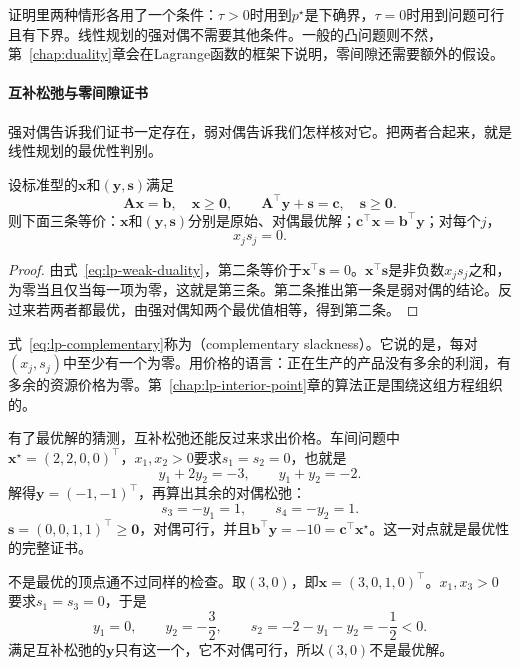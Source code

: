 证明里两种情形各用了一个条件：$\tau>0$时用到$p^\star$是下确界，$\tau=0$时用到问题可行且有下界。线性规划的强对偶不需要其他条件。一般的凸问题则不然，第~\ref{chap:duality}章会在Lagrange函数的框架下说明，零间隙还需要额外的假设。

\paragraph{互补松弛与零间隙证书}
强对偶告诉我们证书一定存在，弱对偶告诉我们怎样核对它。把两者合起来，就是线性规划的最优性判别。

\begin{theorem}[零间隙证书与互补松弛]
 \label{thm:lp-optimality-certificate}
 设标准型的$\bm{x}$和$(\bm{y},\bm{s})$满足
 \begin{equation}
  \bm{A}\bm{x}=\bm{b},\quad\bm{x}\geq\bm{0},\qquad
  \bm{A}^\top\bm{y}+\bm{s}=\bm{c},\quad\bm{s}\geq\bm{0}.
  \label{eq:lp-pd-feasible}
 \end{equation}
 则下面三条等价：$\bm{x}$和$(\bm{y},\bm{s})$分别是原始、对偶最优解；$\bm{c}^\top\bm{x}=\bm{b}^\top\bm{y}$；对每个$j$，
 \begin{equation}
  x_js_j=0.
  \label{eq:lp-complementary}
 \end{equation}
\end{theorem}

\begin{proof}
 由式~\eqref{eq:lp-weak-duality}，第二条等价于$\bm{x}^\top\bm{s}=0$。$\bm{x}^\top\bm{s}$是非负数$x_js_j$之和，为零当且仅当每一项为零，这就是第三条。第二条推出第一条是弱对偶的结论。反过来若两者都最优，由强对偶知两个最优值相等，得到第二条。
\end{proof}

式~\eqref{eq:lp-complementary}称为（complementary slackness）。它说的是，每对$(x_j,s_j)$中至少有一个为零。用价格的语言：正在生产的产品没有多余的利润，有多余的资源价格为零。第~\ref{chap:lp-interior-point}章的算法正是围绕这组方程组织的。

有了最优解的猜测，互补松弛还能反过来求出价格。车间问题中$\bm{x}^\star=(2,2,0,0)^\top$，$x_1,x_2>0$要求$s_1=s_2=0$，也就是
\[
 y_1+2y_2=-3,\qquad y_1+y_2=-2.
\]
解得$\bm{y}=(-1,-1)^\top$，再算出其余的对偶松弛：
\[
 s_3=-y_1=1,\qquad s_4=-y_2=1.
\]
$\bm{s}=(0,0,1,1)^\top\geq\bm{0}$，对偶可行，并且$\bm{b}^\top\bm{y}=-10=\bm{c}^\top\bm{x}^\star$。这一对点就是最优性的完整证书。

不是最优的顶点通不过同样的检查。取$(3,0)$，即$\bm{x}=(3,0,1,0)^\top$。$x_1,x_3>0$要求$s_1=s_3=0$，于是
\[
 y_1=0,\qquad y_2=-\frac32,\qquad s_2=-2-y_1-y_2=-\frac12<0.
\]
满足互补松弛的$\bm{y}$只有这一个，它不对偶可行，所以$(3,0)$不是最优解。

